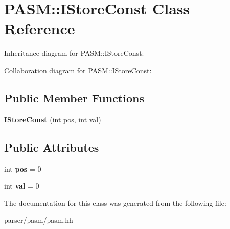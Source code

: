 \hypertarget{classPASM_1_1IStoreConst}{}\section{P\+A\+SM\+:\+:I\+Store\+Const Class Reference}
\label{classPASM_1_1IStoreConst}


Inheritance diagram for P\+A\+SM\+:\+:I\+Store\+Const\+:


Collaboration diagram for P\+A\+SM\+:\+:I\+Store\+Const\+:
\subsection*{Public Member Functions}
\begin{DoxyCompactItemize}
\item 
\mbox{\label{classPASM_1_1IStoreConst_aece5235f14c84672f1429eade4fd737f}} 
{\bfseries I\+Store\+Const} (int pos, int val)
\end{DoxyCompactItemize}
\subsection*{Public Attributes}
\begin{DoxyCompactItemize}
\item 
\mbox{\label{classPASM_1_1IStoreConst_a62c9301e90b6be9a518382334398d7f2}} 
int {\bfseries pos} = 0
\item 
\mbox{\label{classPASM_1_1IStoreConst_ad361f45dbc23d662ca5f33033d894045}} 
int {\bfseries val} = 0
\end{DoxyCompactItemize}


The documentation for this class was generated from the following file\+:\begin{DoxyCompactItemize}
\item 
parser/pasm/pasm.\+hh\end{DoxyCompactItemize}
